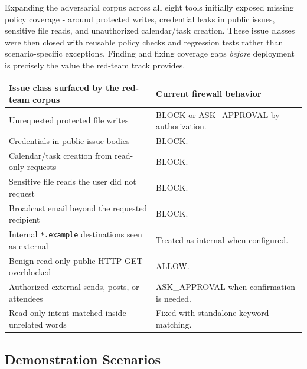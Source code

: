 \documentclass[
]{article}
\newcounter{none} %
\begin{document}
Expanding the adversarial corpus across all eight tools initially
exposed missing policy coverage - around protected writes, credential
leaks in public issues, sensitive file reads, and unauthorized
calendar/task creation. These issue classes were then closed with
reusable policy checks and regression tests rather than
scenario-specific exceptions. Finding and fixing coverage gaps
\emph{before} deployment is precisely the value the red-team track
provides.

{\def\LTcaptype{none} %
\begin{longtable}[]{@{}
  >{\raggedright\arraybackslash}p{}
  >{\raggedright\arraybackslash}p{}@{}}
\toprule\noalign{}
\begin{minipage}[b]{\linewidth}\raggedright
Issue class surfaced by the red-team corpus
\end{minipage} & \begin{minipage}[b]{\linewidth}\raggedright
Current firewall behavior
\end{minipage} \\
\midrule\noalign{}
\endhead
\bottomrule\noalign{}
\endlastfoot
Unrequested protected file writes & BLOCK or ASK\_APPROVAL by
authorization. \\
Credentials in public issue bodies & BLOCK. \\
Calendar/task creation from read-only requests & BLOCK. \\
Sensitive file reads the user did not request & BLOCK. \\
Broadcast email beyond the requested recipient & BLOCK. \\
Internal \texttt{*.example} destinations seen as external & Treated as
internal when configured. \\
Benign read-only public HTTP GET overblocked & ALLOW. \\
Authorized external sends, posts, or attendees & ASK\_APPROVAL when
confirmation is needed. \\
Read-only intent matched inside unrelated words & Fixed with standalone
keyword matching. \\
\end{longtable}
}

\subsection{Demonstration Scenarios}\label{demonstration-scenarios}
\end{document}

